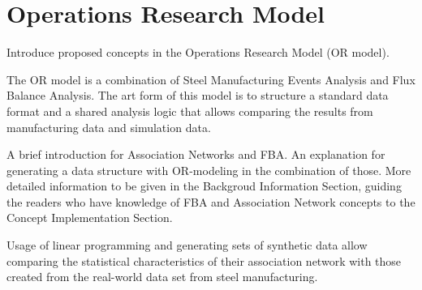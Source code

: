 \section{Operations Research Model}

{\color{red} 
	
	Introduce proposed concepts in the Operations Research Model (OR model).
	
	The OR model is a combination of Steel Manufacturing Events Analysis and Flux Balance Analysis. The art form of this model is to structure a standard data format and a shared analysis logic that allows comparing the results from manufacturing data and simulation data.
	
	A brief introduction for Association Networks and FBA. 
	An explanation for generating a data structure with OR-modeling in the combination of those. More detailed information to be given in the Backgroud Information Section, guiding the readers who have knowledge of FBA and Association Network concepts to the Concept Implementation Section.
	
	Usage of linear programming and generating sets of synthetic data allow comparing the statistical characteristics of their association network with those created from the real-world data set from steel manufacturing.
	
}

\clearpage




